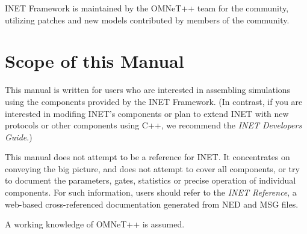 INET Framework is maintained by the OMNeT++ team for the community,
utilizing patches and new models contributed by members of the community.

\section{Scope of this Manual}
\label{sec:introduction:scope-of-this-manual}

This manual is written for users who are interested in assembling
simulations using the components provided by the INET Framework.
(In contrast, if you are interested in modifing INET's components or plan
to extend INET with new protocols or other components using C++,
we recommend the \textit{INET Developers Guide}.)

This manual does not attempt to be a reference for INET. It concentrates
on conveying the big picture, and does not attempt to cover all
components, or try to document the parameters, gates, statistics or
precise operation of individual components. For such information,
users should refer to the \textit{INET Reference}, a web-based
cross-referenced documentation generated from NED and MSG files.

A working knowledge of OMNeT++ is assumed.



